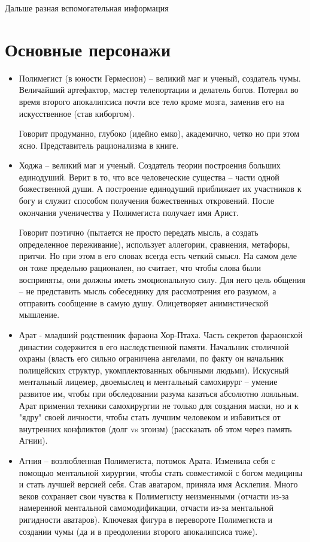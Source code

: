 \documentclass[12pt,a4paper]{article}
\begin{document}
\newpage
Дальше разная вспомогательная информация

\section*{Основные персонажи}
\begin{itemize}
	\item Полимегист (в юности Гермесион) -- великий маг и ученый, создатель чумы. Величайший артефактор, мастер телепортации и делатель богов. Потерял во время второго апокалипсиса почти все тело кроме мозга, заменив его на искусственное (став киборгом).
	
	Говорит продуманно, глубоко (идейно емко), академично, четко но при этом ясно. Представитель рационализма в книге.
	
	\item Ходжа -- великий маг и ученый. Создатель теории построения больших единодуший. Верит в то, что все человеческие существа -- части одной божественной души. А построение единодуший приближает их участников к богу и служит способом получения божественных откровений. После окончания ученичества у Полимегиста получает имя Арист.

	Говорит поэтично (пытается не просто передать мысль, а создать определенное переживание), использует аллегории, сравнения, метафоры, притчи. Но при этом в его словах всегда есть четкий смысл. На самом деле он тоже предельно рационален, но считает, что чтобы слова были восприняты, они должны иметь эмоциональную силу. Для него цель общения -- не представить мысль собеседнику для рассмотрения его разумом, а отправить сообщение в самую душу. Олицетворяет анимистической мышление.

	\item Арат - младший родственник фараона Хор-Птаха. Часть секретов фараонской династии содержится в его наследственной памяти. Начальник столичной охраны (власть его сильно ограничена ангелами, по факту он начальник полицейских структур, укомплектованных обычными людьми). Искусный ментальный лицемер, двоемыслец и ментальный самохирург -- умение развитое им, чтобы при обследовании разума казаться абсолютно лояльным. Арат применил техники самохирургии не только для создания маски, но и к "ядру" своей личности, чтобы стать лучшим человеком и избавиться от внутренних конфликтов (долг vs эгоизм) (рассказать об этом через память Агнии).
	
	\item Агния -- возлюбленная Полимегиста, потомок Арата. Изменила себя с помощью ментальной хирургии, чтобы стать совместимой с богом медицины и стать лучшей версией себя. Став аватаром, приняла имя Асклепия. Много веков сохраняет свои чувства к Полимегисту неизменными (отчасти из-за намеренной ментальной самомодификации, отчасти из-за ментальной ригидности аватаров). Ключевая фигура в перевороте Полимегиста и создании чумы (да и в преодолении второго апокалипсиса тоже).
	

\end{itemize}
\end{document}
